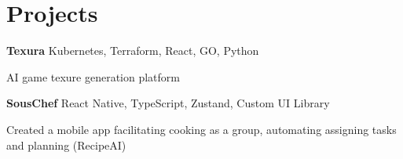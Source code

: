 
\newenvironment{twocolentry_proj}[2][]{
    \onecolentry
    \def\secondColumn{#2}
    \setcolumnwidth{\fill, 7 cm}
    \begin{paracol}{2}
}{
    \switchcolumn \raggedleft \secondColumn
    \end{paracol}
    \endonecolentry
} %

\vspace{5 pt - 0.5 cm}
\section{Projects}
\begin{twocolentry_proj}{
    \mbox{}%
}
\fontsize{11 pt}{11 pt}\textbf{Texura} Kubernetes, Terraform, React, GO, Python
\end{twocolentry_proj}

\begin{onecolentry}
    \begin{highlights}
        \item AI game texure generation platform
    \end{highlights}
\end{onecolentry}



\vspace{0.10 cm}
\begin{twocolentry_proj}{
    \mbox{}%
}
\fontsize{11 pt}{11 pt}\textbf{SousChef} React Native, TypeScript, Zustand, Custom UI Library  
\end{twocolentry_proj}
\begin{onecolentry}
    \begin{highlights}
        \item Created a mobile app facilitating cooking as a group, automating assigning tasks and planning (RecipeAI)
    \end{highlights}
\end{onecolentry}

